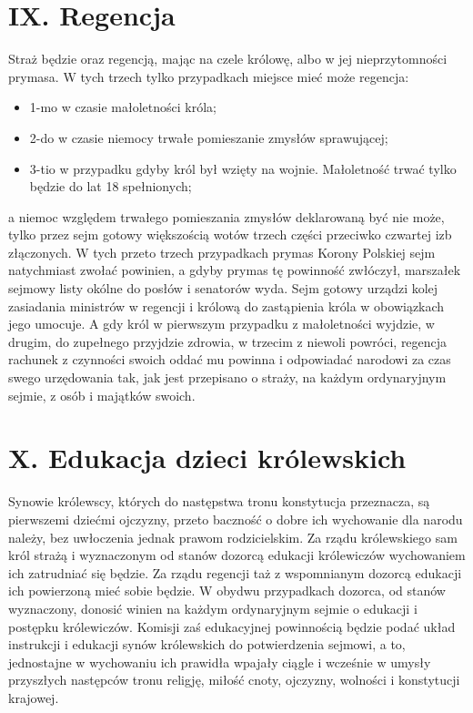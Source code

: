 \documentclass{book}
\begin{document}
 
\section*{IX. Regencja}

 Straż będzie oraz regencją, mając na czele królowę, albo w jej nieprzytomności prymasa.  W tych trzech tylko przypadkach miejsce mieć może regencja:  
\begin{itemize}
\item 1-mo w czasie małoletności króla; 
\item 2-do w czasie niemocy trwałe pomieszanie zmysłów sprawującej;  
\item 3-tio w przypadku gdyby król był wzięty na wojnie.  Małoletność trwać tylko będzie do lat 18 spełnionych;
\end{itemize}
a niemoc względem trwałego pomieszania zmysłów deklarowaną być nie może, tylko przez sejm gotowy większością wotów trzech części przeciwko czwartej izb złączonych.  W tych przeto trzech przypadkach prymas Korony Polskiej sejm natychmiast zwołać powinien, a gdyby prymas tę powinność zwłóczył, marszałek sejmowy listy okólne  do posłów i senatorów wyda.  Sejm gotowy urządzi kolej zasiadania ministrów w regencji i królową do zastąpienia króla w obowiązkach jego umocuje.  A gdy król w pierwszym przypadku z małoletności wyjdzie, w drugim, do zupełnego przyjdzie zdrowia, w trzecim z niewoli powróci, regencja rachunek z czynności  swoich oddać mu powinna i odpowiadać narodowi za czas swego urzędowania tak, jak jest przepisano o straży, na każdym ordynaryjnym sejmie,  z osób i majątków swoich.  

 
\section*{X. Edukacja dzieci królewskich}

Synowie królewscy, których do następstwa tronu konstytucja przeznacza, są pierwszemi dziećmi ojczyzny, przeto baczność o dobre ich wychowanie dla narodu należy, bez uwłoczenia jednak prawom rodzicielskim. Za rządu królewskiego sam król strażą i wyznaczonym od stanów dozorcą edukacji królewiczów wychowaniem ich zatrudniać się będzie. Za rządu regencji taż z wspomnianym dozorcą edukacji ich powierzoną mieć sobie będzie. W obydwu przypadkach dozorca, od stanów wyznaczony, donosić winien na każdym ordynaryjnym sejmie o edukacji i postępku królewiczów. Komisji zaś edukacyjnej powinnością będzie podać układ instrukcji i edukacji synów królewskich do potwierdzenia sejmowi, a to, jednostajne w wychowaniu ich prawidła wpajały ciągle i wcześnie w umysły przyszłych następców tronu religję, miłość cnoty, ojczyzny, wolności i konstytucji krajowej.
 
\end{document}
